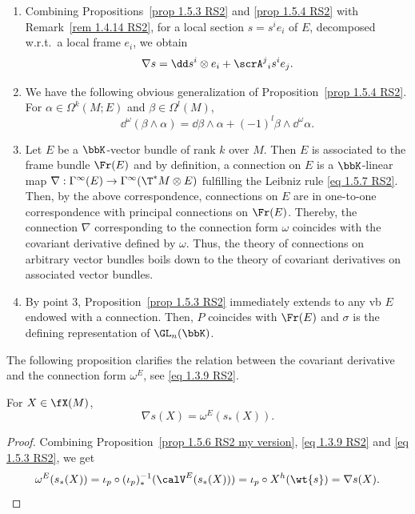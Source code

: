\begin{rem}\label{rem 1.5.5 RS2}
    \begin{enumerate}
        \item Combining Propositions~\ref{prop 1.5.3 RS2} and \ref{prop 1.5.4 RS2} with Remark~\ref{rem 1.4.14 RS2}, for a local section $s=s^ie_i$ of $E$, decomposed w.r.t.\ a local frame $e_i$, we obtain
        \[\nabla s=\dd s^i\otimes e_i+\scrA^j{}_i s^i e_j.\label{eq 1.5.8 RS2}\]
        \item We have the following obvious generalization of Proposition~\ref{prop 1.5.4 RS2}. For $\alpha\in\Omega^k(M;E)$ and $\beta\in\Omega^l(M)$,
        \[\dd^\omega(\beta\wedge\alpha)=\dd\beta\wedge\alpha+(-1)^l\beta\wedge\dd^\omega \alpha.\]
        \item Let $E$ be a $\bbK$-vector bundle of rank $k$ over $M$. Then $E$ is associated to the frame bundle $\Fr(E)$ and by definition, a connection on $E$ is a $\bbK$-linear map $\nabla:\Gamma^\infty(E)\to \Gamma^\infty(\T^\ast M\otimes E)$ fulfilling the Leibniz rule \eqref{eq 1.5.7 RS2}. Then, by the above correspondence, connections on $E$ are in one-to-one correspondence with principal connections on $\Fr(E)$. Thereby, the connection $\nabla$ corresponding to the connection form $\omega$ coincides with the covariant derivative defined by $\omega$. Thus, the theory of connections on arbitrary vector bundles boils down to the theory of covariant derivatives on associated vector bundles.
        \item By point 3, Proposition~\ref{prop 1.5.3 RS2} immediately extends to any \gls{vb} $E$ endowed with a connection. Then, $P$ coincides with $\Fr(E)$ and $\sigma$ is the defining representation of $\GL_n(\bbK)$.
    \end{enumerate}
\end{rem}

The following proposition clarifies the relation between the covariant derivative and the connection form $\omega^E$, see \eqref{eq 1.3.9 RS2}.

\begin{prop}[{{\cite[Prop.~1.5.6]{RS2}}}]\label{prop 1.5.6 RS2}
    For $X\in\fX(M)$,
    \[\nabla s(X)=\omega^E(s_\ast(X)).\]
\end{prop}
\begin{proof}
    Combining Proposition~\ref{prop 1.5.6 RS2 my version}, \eqref{eq 1.3.9 RS2} and \eqref{eq 1.5.3 RS2}, we get
    \[\omega^E(s_\ast(X))=\iota_p\circ (\iota_p)_\ast^{-1}(\calV^E(s_\ast(X)))=\iota_p\circ X^h(\wt{s})=\nabla s(X).\]
\end{proof}

